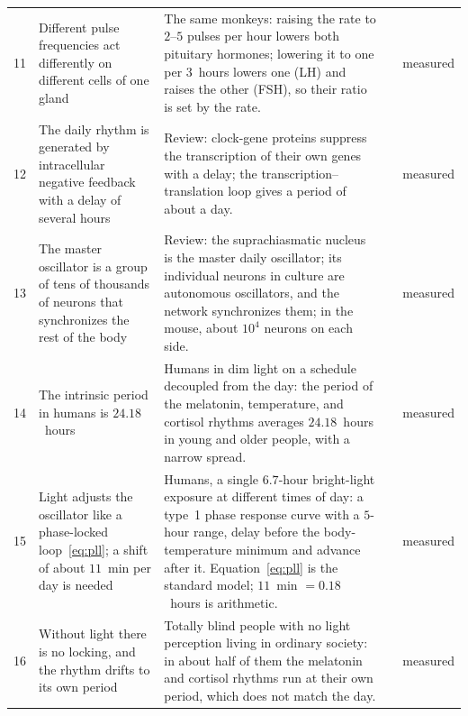 {\begin{longtable}{>{\raggedright}p{0.5cm}>{\raggedright}p{4.0cm}>{\raggedright}p{5.6cm}>{\raggedright}p{2.3cm}>{\raggedright\arraybackslash}p{1.7cm}}
11 & Different pulse frequencies act differently on different cells of one gland & The same monkeys: raising the rate to $2$--$5$ pulses per hour lowers both pituitary hormones; lowering it to one per $3$~hours lowers one (LH) and raises the other (FSH), so their ratio is set by the rate. & \cite{Wildt1981gnrh} & measured \\
12 & The daily rhythm is generated by intracellular negative feedback with a delay of several hours & Review: clock-gene proteins suppress the transcription of their own genes with a delay; the transcription--translation loop gives a period of about a day. & \cite{TakahashiJS2017} & measured \\
13 & The master oscillator is a group of tens of thousands of neurons that synchronizes the rest of the body & Review: the suprachiasmatic nucleus is the master daily oscillator; its individual neurons in culture are autonomous oscillators, and the network synchronizes them; in the mouse, about $10^4$ neurons on each side. & \cite{Welsh2010scn} & measured \\
14 & The intrinsic period in humans is $24.18$~hours & Humans in dim light on a schedule decoupled from the day: the period of the melatonin, temperature, and cortisol rhythms averages $24.18$~hours in young and older people, with a narrow spread. & \cite{Czeisler1999} & measured \\
15 & Light adjusts the oscillator like a phase-locked loop~\eqref{eq:pll}; a shift of about $11$~min per day is needed & Humans, a single $6.7$-hour bright-light exposure at different times of day: a type~1 phase response curve with a $5$-hour range, delay before the body-temperature minimum and advance after it. Equation~\eqref{eq:pll} is the standard model; $11$~min $=0.18$~hours is arithmetic. & \cite{Khalsa2003prc} & measured \\
16 & Without light there is no locking, and the rhythm drifts to its own period & Totally blind people with no light perception living in ordinary society: in about half of them the melatonin and cortisol rhythms run at their own period, which does not match the day. & \cite{Sack1992blind} & measured \\
\bottomrule
\end{longtable}}
